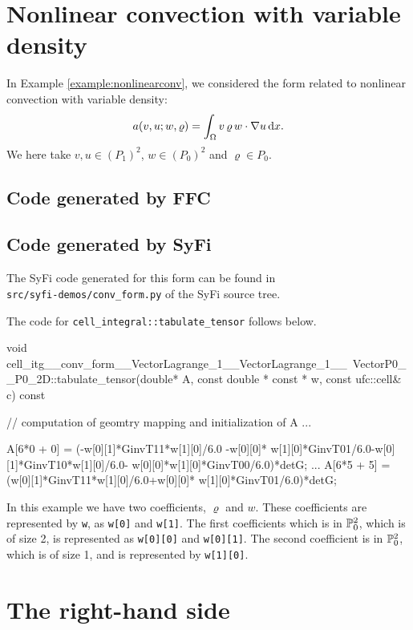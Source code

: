 \section{Nonlinear convection with variable density} 

In Example \ref{example:nonlinearconv}, we considered the
form related to nonlinear convection with variable density:
\begin{equation}
a(v,u;w,\varrho) = \int_{\Omega} v \, \varrho \, w \cdot \nabla  u \dx. 
\end{equation}
We here take $v, u \in (P_1)^2$, $w\in (P_0)^2$ and  $\varrho \in P_0$.

\subsection{Code generated by FFC}

\subsection{Code generated by SyFi}

The SyFi code generated for this form can be found in \\ 
\texttt{src/syfi-demos/conv\_form.py} of the SyFi source tree.

The code for \texttt{cell\_integral::tabulate\_tensor} follows below.
\begin{code}
void cell_itg__conv_form__VectorLagrange_1__VectorLagrange_1__\
     VectorP0__P0_2D::tabulate_tensor(double* A, 
     const double * const * w, const ufc::cell& c) const
{
  // computation of geomtry mapping and initialization of A ...
  
  A[6*0 + 0] = (-w[0][1]*GinvT11*w[1][0]/6.0 -w[0][0]*
      w[1][0]*GinvT01/6.0-w[0][1]*GinvT10*w[1][0]/6.0-
      w[0][0]*w[1][0]*GinvT00/6.0)*detG;
   ...
  A[6*5 + 5] = (w[0][1]*GinvT11*w[1][0]/6.0+w[0][0]*
      w[1][0]*GinvT01/6.0)*detG;
}
\end{code}

In this example we have two coefficients, $\varrho$ and $w$. These 
coefficients are represented by \texttt{w}, as \texttt{w[0]} and \texttt{w[1]}. The first coefficients
which is in $\P_0^2$, which is of size 2, is represented as 
\texttt{w[0][0]} and \texttt{w[0][1]}. The second coefficient 
is in $\P_0^2$, which is of size 1, and is represented by \texttt{w[1][0]}.  

\section{The right-hand side}

